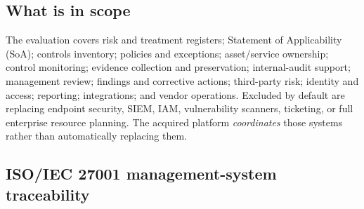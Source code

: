 \documentclass[10pt,letterpaper]{article}
\begin{document}
\subsection{What is in scope}
The evaluation covers risk and treatment registers; Statement of Applicability (SoA); controls inventory; policies and exceptions; asset/service ownership; control monitoring; evidence collection and preservation; internal-audit support; management review; findings and corrective actions; third-party risk; identity and access; reporting; integrations; and vendor operations. Excluded by default are replacing endpoint security, SIEM, IAM, vulnerability scanners, ticketing, or full enterprise resource planning. The acquired platform \emph{coordinates} those systems rather than automatically replacing them.

\subsection{ISO/IEC 27001 management-system traceability}
\small
\end{document}

